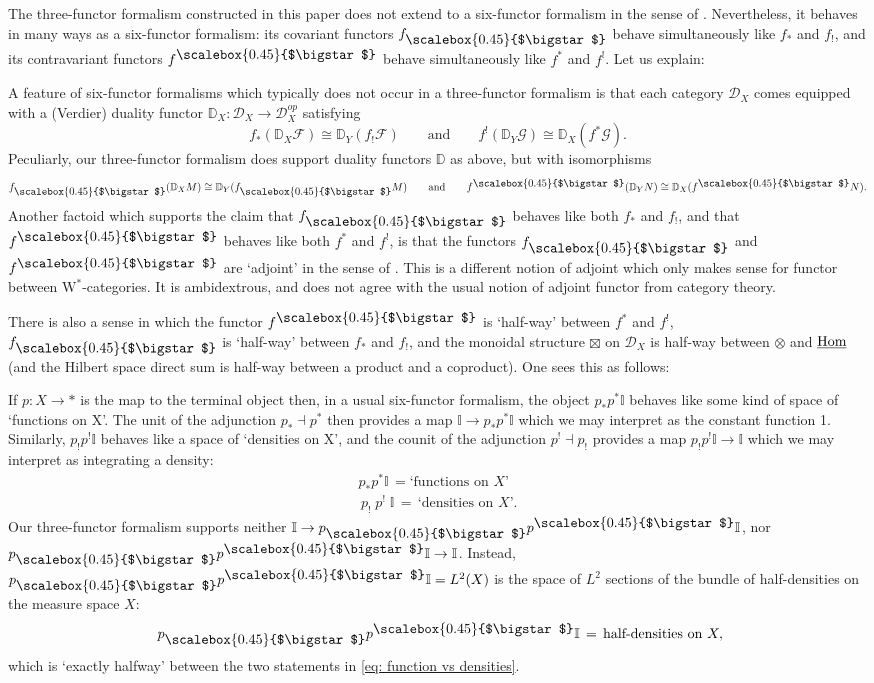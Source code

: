 \documentclass[10pt,a4paper,oneside]{amsart}
\theoremstyle{remark}
\theoremstyle{definition}
\newcommand{\Hom}{\textnormal{Hom}}
\newcommand{\smsq}{{\mathbin{\vcenter{\hbox{\scalebox{0.45}{$\bigstar$}}}}}}
\newcommand{\pull}[1]{#1^\smsq}
\newcommand{\push}[1]{#1_\smsq}
\begin{document}
The three-functor formalism 
constructed in this paper 
does not extend to a six-functor formalism in the sense of \cite{Scholze2022}.
Nevertheless, it behaves in many ways as a six-functor formalism: its covariant functors $\push{f}$ behave simultaneously like $f_*$ and $f_!$, and its contravariant functors $ \pull{f}$  behave simultaneously like $f^*$ and $f^!$. Let us explain:

A feature of six-functor formalisms which typically does not occur in a three-functor formalism is that each category $\mathcal D_X$ comes equipped with a (Verdier) duality functor
$\mathbb D_X:\mathcal D_X\to \mathcal D_X^{op}$
satisfying
\[
f_*(\mathbb D_X\mathcal F) \cong 
\mathbb D_Y(f_!\mathcal F)
\qquad
\text{and}
\qquad
f^!(\mathbb D_Y\mathcal G) \cong 
\mathbb D_X(f^*\mathcal G).
\]
Peculiarly, our three-functor formalism does support duality functors $\mathbb D$ as above, but with isomorphisms
\[
\push{f}(\mathbb D_X M) \cong 
\mathbb D_Y(\push{f} M)
\qquad
\text{and}
\qquad
\pull{f}(\mathbb D_YN) \cong 
\mathbb D_X(\pull{f}N).
\]
Another factoid which supports the claim that $\push{f}$ behaves like both $f_*$ and $f_!$, and that $ \pull{f}$  behaves like both $f^*$ and $f^!$, is that 
the functors $\push{f}$ and $\pull{f}$ are `adjoint' in the sense of \cite[Def~4.14]{Henriques2024}.
This is a different notion of adjoint which only makes sense for functor between $\mathrm{W}^*$-categories. It is ambidextrous, and does not agree with the usual notion of adjoint functor from category theory.

There is also a sense in which the functor $\pull{f}$ is `half-way' between $f^*$ and $f^!$, $\push{f}$ is `half-way' between $f_*$ and $f_!$, and the monoidal structure $\boxtimes$ on $\mathcal D_X$ is half-way between $\otimes$ and $\underline{\Hom}$ (and the Hilbert space direct sum is half-way between a product and a coproduct). One sees this as follows:

If $p:X\to *$ is the map to the terminal object then, in a usual six-functor formalism, the object $p_*p^*\mathbb I$ behaves like some kind of space of `functions on X'. The unit of the adjunction $p_* \dashv p^*$ then provides a map
$\mathbb I\to p_*p^*\mathbb I$ which we may interpret as the constant function 1.
Similarly, $p_!p^!\mathbb I$ behaves like a space of `densities on X', and the counit of the adjunction $p^! \dashv p_!$ provides a map $p_!p^!\mathbb I \to \mathbb I$
which we may interpret as integrating a density:
\begin{equation}
\label{eq: function vs densities}
\begin{split}
p_*p^*\mathbb I \,= \text{`functions on $X$'}\,\\
\,p_!\;\!p^!\;\!\mathbb I \,=\, \text{`densities on $X$'}.
\end{split}
\end{equation}
Our three-functor formalism supports neither 
$\mathbb I\to \push{p}\pull{p}\mathbb I$,
nor $\push{p}\pull{p}\mathbb I\to \mathbb I$.
Instead, $\push{p}\pull{p}\mathbb I=L^2(X)$ is the space of $L^2$ sections of the bundle of half-densities on the measure space $X$:
\[
\,\,\push{p}\pull{p}\mathbb I \,=\, \text{half-densities on }X,
\]
which is `exactly halfway' between the two statements in \eqref{eq: function vs densities}.
\end{document}
